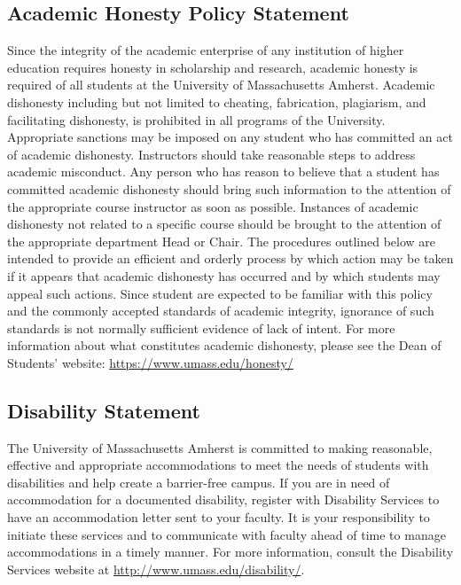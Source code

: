 \documentclass[11pt,twoside]{article}
\numberwithin{equation}{section}
\newcommand{\?}{\stackrel{?}{=}}
\begin{document}
\subsection{Academic Honesty Policy Statement}
Since the integrity of the academic enterprise of any institution of higher education requires
honesty in scholarship and research, academic honesty is required of all students at the
University of Massachusetts Amherst. Academic dishonesty including but not limited to
cheating, fabrication, plagiarism, and facilitating dishonesty, is prohibited in all programs of
the University. Appropriate sanctions may be imposed on any student who has committed
an act of academic dishonesty. Instructors should take reasonable steps to address academic
misconduct. Any person who has reason to believe that a student has committed academic
dishonesty should bring such information to the attention of the appropriate course
instructor as soon as possible. Instances of academic dishonesty not related to a specific
course should be brought to the attention of the appropriate department Head or Chair. The
procedures outlined below are intended to provide an efficient and orderly process by which
action may be taken if it appears that academic dishonesty has occurred and by which
students may appeal such actions. Since student are expected to be familiar with this policy
and the commonly accepted standards of academic integrity, ignorance of such standards is
not normally sufficient evidence of lack of intent.
For more information about what constitutes academic dishonesty, please see the Dean of
Students’ website: \url{https://www.umass.edu/honesty/}

\subsection{Disability Statement}
The University of Massachusetts Amherst is committed to making reasonable, effective and
appropriate accommodations to meet the needs of students with disabilities and help create a
barrier-free campus. If you are in need of accommodation for a documented disability,
register with Disability Services to have an accommodation letter sent to your faculty. It is
your responsibility to initiate these services and to communicate with faculty ahead of time
to manage accommodations in a timely manner. For more information, consult the
Disability Services website at \url{http://www.umass.edu/disability/}.
\end{document}
